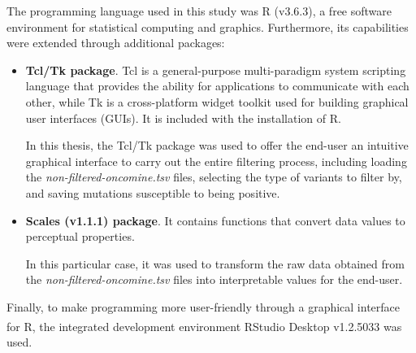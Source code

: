The programming language used in this study was \textsf{R} (v3.6.3), a free software environment for statistical computing and graphics. Furthermore, its capabilities were extended through additional packages:
\begin{itemize}
    \item \textbf{Tcl\slash Tk package}. Tcl is a general-purpose multi-paradigm system scripting language that provides the ability for applications to communicate with each other, while Tk is a cross-platform widget toolkit used for building graphical user interfaces (GUIs). It is included with the installation of \textsf{R}.
    
    In this thesis, the Tcl\slash Tk package was used to offer the end-user an intuitive graphical interface to carry out the entire filtering process, including loading the \textit{non-filtered-oncomine.tsv} files, selecting the type of variants to filter by, and saving mutations susceptible to being positive.
    \item \textbf{Scales (v1.1.1) package}. It contains functions that convert data values to perceptual properties. 
    
    In this particular case, it was used to transform the raw data obtained from the \textit{non-filtered-oncomine.tsv} files into interpretable values for the end-user.
\end{itemize}

Finally, to make programming more user-friendly through a graphical interface for \textsf{R}, the integrated development environment RStudio\textsuperscript\textregistered{} Desktop v1.2.5033 was used.